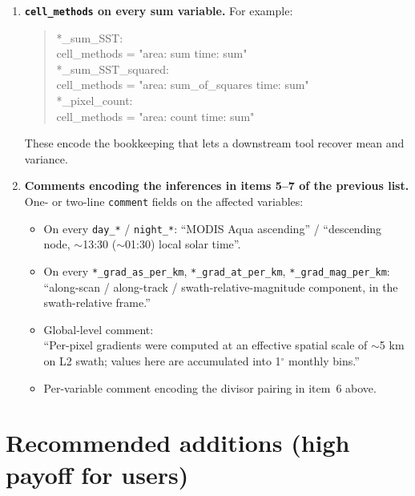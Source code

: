 \documentclass[11pt]{article}
\begin{document}
\begin{enumerate}[leftmargin=*,topsep=2pt]
\begin{quote}
    \end{quote}
  \item \textbf{\texttt{cell\_methods} on every sum variable.}
    For example:
    \begin{quote}\ttfamily
      *\_sum\_SST:\\
      \phantom{xx}cell\_methods = "area: sum time: sum"\\
      *\_sum\_SST\_squared:\\
      \phantom{xx}cell\_methods = "area: sum\_of\_squares time: sum"\\
      *\_pixel\_count:\\
      \phantom{xx}cell\_methods = "area: count time: sum"
    \end{quote}
    These encode the bookkeeping that lets a downstream tool
    recover mean and variance.
  \item \textbf{Comments encoding the inferences in items 5--7 of
    the previous list.} One- or two-line \texttt{comment} fields
    on the affected variables:
    \begin{itemize}[topsep=0pt]
      \item On every \texttt{day\_*} / \texttt{night\_*}:
        ``MODIS Aqua ascending'' / ``descending node, $\sim$13:30
        ($\sim$01:30) local solar time''.
      \item On every \texttt{*\_grad\_as\_per\_km},
        \texttt{*\_grad\_at\_per\_km}, \texttt{*\_grad\_mag\_per\_km}:
        ``along-scan / along-track / swath-relative-magnitude
        component, in the swath-relative frame.''
      \item Global-level comment: \\
        ``Per-pixel gradients were computed at an effective
        spatial scale of $\sim$5 km on L2 swath; values here are
        accumulated into 1$^\circ$ monthly bins.''
      \item Per-variable comment encoding the divisor pairing
        in item~6 above.
    \end{itemize}
\end{enumerate}

\section*{Recommended additions (high payoff for users)}
\end{document}
